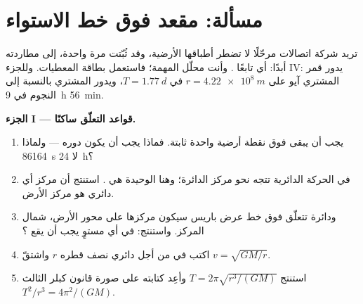 \section{مسألة: مقعد فوق خط الاستواء}

\begin{problem}
\label{pb:g12:satellites-kepler:1}
تريد شركة اتصالات مرحّلًا لا تضطر أطباقها الأرضية، وقد ثُبّتت
مرة واحدة، إلى مطاردته أبدًا: أي تابعًا . وأنت
محلّل المهمة؛ فاستعمل بطاقة المعطيات. وللجزء IV: يدور قمر المشتري آيو
على $r = \qty{4.22e8}{m}$ في $T = \qty{1.77}{d}$، ويدور المشتري
بالنسبة إلى النجوم في \qty{9}{h} \qty{56}{min}.

\medskip
\noindent\textbf{الجزء I --- قواعد التعلّق ساكنًا.}
\begin{enumerate}
  \item يجب أن يبقى  فوق نقطة أرضية واحدة ثابتة. فماذا
        يجب أن يكون دوره --- ولماذا 
        \qty{86164}{s} لا \qty{24}{h}؟
  \item في الحركة الدائرية تتجه  نحو مركز
        الدائرة؛ وهنا  الوحيدة هي . استنتج أن
        مركز أي  دائري هو مركز الأرض.
  \item ودائرة تتعلّق فوق خط عرض باريس سيكون مركزها
        على محور الأرض، شمال المركز. واستنتج: في أي
        مستوٍ يجب أن يقع ؟
  \item اكتب  في  من أجل 
        دائري نصف قطره $r$ واشتقّ $v = \sqrt{GM/r}$.
  \item استنتج $T = 2\pi\sqrt{r^3/(GM)}$ وأعِد كتابته على صورة قانون كبلر
        الثالث $T^2/r^3 = 4\pi^2/(GM)$.
\end{enumerate}


\end{problem}
